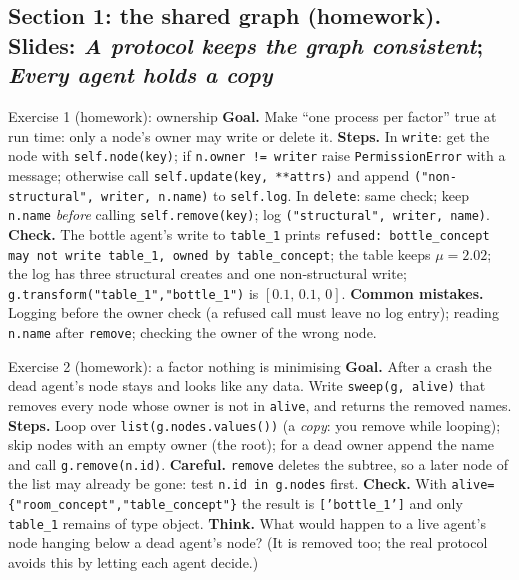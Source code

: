 \documentclass[11pt]{article}
\begin{document}
\subsection*{Section 1: the shared graph (homework). Slides: \emph{A protocol keeps the graph consistent}; \emph{Every agent holds a copy}}

\begin{labhelp}{Exercise 1 (homework): ownership}
\textbf{Goal.} Make ``one process per factor'' true at run time: only a node's owner may write or delete it. \textbf{Steps.} In \texttt{write}: get the node with \texttt{self.node(key)}; if \texttt{n.owner != writer} raise \texttt{PermissionError} with a message; otherwise call \texttt{self.update(key, **attrs)} and append \texttt{("non-structural", writer, n.name)} to \texttt{self.log}. In \texttt{delete}: same check; keep \texttt{n.name} \emph{before} calling \texttt{self.remove(key)}; log \texttt{("structural", writer, name)}. \textbf{Check.} The bottle agent's write to \texttt{table\_1} prints \texttt{refused: bottle\_concept may not write table\_1, owned by table\_concept}; the table keeps $\mu=2.02$; the log has three structural creates and one non-structural write; \texttt{g.transform("table\_1","bottle\_1")} is $[0.1,\,0.1,\,0]$. \textbf{Common mistakes.} Logging before the owner check (a refused call must leave no log entry); reading \texttt{n.name} after \texttt{remove}; checking the owner of the wrong node.
\end{labhelp}

\begin{labhelp}{Exercise 2 (homework): a factor nothing is minimising}
\textbf{Goal.} After a crash the dead agent's node stays and looks like any data. Write \texttt{sweep(g, alive)} that removes every node whose owner is not in \texttt{alive}, and returns the removed names. \textbf{Steps.} Loop over \texttt{list(g.nodes.values())} (a \emph{copy}: you remove while looping); skip nodes with an empty owner (the root); for a dead owner append the name and call \texttt{g.remove(n.id)}. \textbf{Careful.} \texttt{remove} deletes the subtree, so a later node of the list may already be gone: test \texttt{n.id in g.nodes} first. \textbf{Check.} With \texttt{alive=\{"room\_concept","table\_concept"\}} the result is \texttt{['bottle\_1']} and only \texttt{table\_1} remains of type object. \textbf{Think.} What would happen to a live agent's node hanging below a dead agent's node? (It is removed too; the real protocol avoids this by letting each agent decide.)
\end{labhelp}
\end{document}
